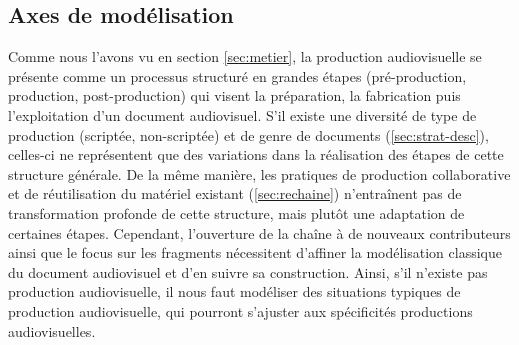 



\subsection{Axes de modélisation}\label{sec:axes}
Comme nous l'avons vu en section \ref{sec:metier}, la production audiovisuelle se présente comme un processus structuré en grandes étapes (pré-production, production, post-production) qui visent la préparation, la fabrication puis l'exploitation d'un document audiovisuel.
S'il existe une diversité de type de production (scriptée, non-scriptée) et de genre de documents (\ref{sec:strat-desc}), celles-ci ne représentent que des variations dans la réalisation des étapes de cette structure générale.  
De la même manière, les pratiques de production collaborative et de réutilisation du matériel existant (\ref{sec:rechaine}) n'entraînent pas de transformation profonde de cette structure, mais plutôt une adaptation de certaines étapes. 
Cependant, l'ouverture de la chaîne à de nouveaux contributeurs ainsi que le focus sur les fragments nécessitent d'affiner la modélisation classique du document audiovisuel et d'en suivre sa construction. 
Ainsi, s'il n'existe pas  production audiovisuelle, il nous faut modéliser des situations typiques de  production audiovisuelle, qui pourront s'ajuster aux spécificités  productions audiovisuelles.


